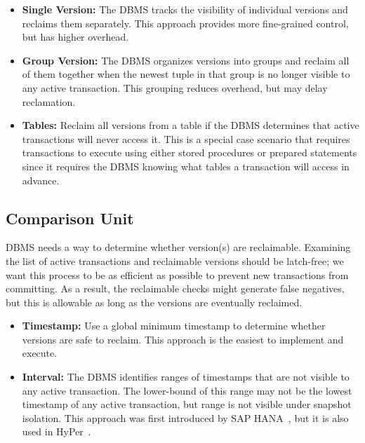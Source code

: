\documentclass[11pt]{article}
\begin{document}
\begin{itemize}
    \item \textbf{Single Version:}
    The DBMS tracks the visibility of individual versions and reclaims them 
    separately. This approach provides more fine-grained control, but has higher overhead.
    
    \item \textbf{Group Version:}
    The DBMS organizes versions into groups and reclaim all of them together when the newest tuple 
    in that group is no longer visible to any active transaction. This grouping reduces overhead, 
    but may delay reclamation.
    
    \item \textbf{Tables:}
    Reclaim all versions from a table if the DBMS determines that active 
    transactions will never access it. This is a special case scenario that requires 
    transactions to execute using either stored procedures or prepared statements since it requires 
    the DBMS knowing what tables a transaction will access in advance.

\end{itemize}

\subsection*{Comparison Unit}
DBMS needs a way to determine whether version(s) are reclaimable. Examining the list of active 
transactions and reclaimable versions should be latch-free; we want this process to be as efficient 
as possible to prevent new transactions from committing. As a result, the reclaimable checks might 
generate false negatives, but this is allowable as long as the versions are eventually reclaimed.

\begin{itemize}
    \item \textbf{Timestamp:}
    Use a global minimum timestamp to determine whether versions 
    are safe to reclaim. This approach is the easiest to implement and execute.
    
    \item \textbf{Interval:}
    The DBMS identifies ranges of timestamps that are not visible to any active transaction. The 
    lower-bound of this range may not be the lowest timestamp of any active transaction, but range 
    is not visible under snapshot isolation. This approach was first introduced by SAP 
    HANA~\cite{jlee2016sap}, but it is also used in HyPer~\cite{bottcher19}.  
\end{itemize}
\end{document}
